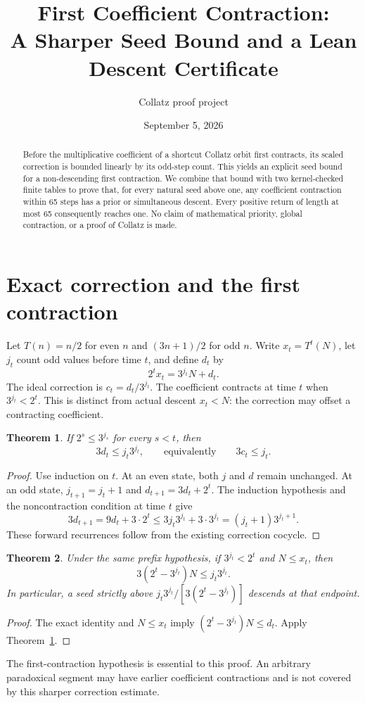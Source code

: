\documentclass[10pt]{article}
\title{First Coefficient Contraction:\\A Sharper Seed Bound and a Lean Descent Certificate}
\author{Collatz proof project}
\date{September 5, 2026}
\newtheorem{theorem}{Theorem}
\begin{document}
\maketitle
\begin{abstract}
Before the multiplicative coefficient of a shortcut Collatz orbit first
contracts, its scaled correction is bounded linearly by its odd-step count.
This yields an explicit seed bound for a non-descending first contraction.
We combine that bound with two kernel-checked finite tables to prove that,
for every natural seed above one, any coefficient contraction within
65 steps has a prior or simultaneous descent. Every positive return of
length at most 65 consequently reaches one. No claim of mathematical
priority, global contraction, or a proof of Collatz is made.
\end{abstract}

\section{Exact correction and the first contraction}
Let $T(n)=n/2$ for even $n$ and $(3n+1)/2$ for odd $n$. Write
$x_t=T^t(N)$, let $j_t$ count odd values before time $t$, and define $d_t$ by
\[
2^t x_t=3^{j_t}N+d_t.
\]
The ideal correction is $c_t=d_t/3^{j_t}$. The coefficient contracts at
time $t$ when $3^{j_t}<2^t$. This is distinct from actual descent $x_t<N$:
the correction may offset a contracting coefficient.
\begin{theorem}\label{thm:correction}
If $2^s\le3^{j_s}$ for every $s<t$, then
\[
3d_t\le j_t3^{j_t},\qquad\text{equivalently}\qquad 3c_t\le j_t.
\]
\end{theorem}
\begin{proof}
Use induction on $t$. At an even state, both $j$ and $d$ remain unchanged.
At an odd state, $j_{t+1}=j_t+1$ and $d_{t+1}=3d_t+2^t$. The induction
hypothesis and the noncontraction condition at time $t$ give
\[
3d_{t+1}=9d_t+3\cdot2^t
 \le3j_t3^{j_t}+3\cdot3^{j_t}
 =(j_t+1)3^{j_t+1}.
\]
These forward recurrences follow from the existing correction cocycle.
\end{proof}
\begin{theorem}\label{thm:seed}
Under the same prefix hypothesis, if $3^{j_t}<2^t$ and $N\le x_t$, then
\[
3(2^t-3^{j_t})N\le j_t3^{j_t}.
\]
In particular, a seed strictly above
$j_t3^{j_t}/[3(2^t-3^{j_t})]$ descends at that endpoint.
\end{theorem}
\begin{proof}
The exact identity and $N\le x_t$ imply
$(2^t-3^{j_t})N\le d_t$. Apply Theorem~\ref{thm:correction}.
\end{proof}
The first-contraction hypothesis is essential to this proof. An arbitrary
paradoxical segment may have earlier coefficient contractions and is not
covered by this sharper correction estimate.
\end{document}
